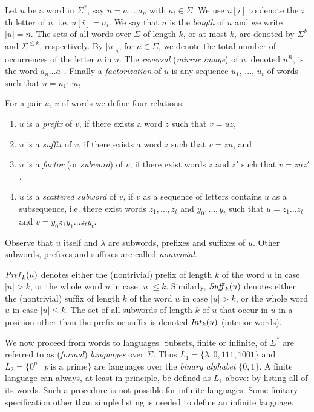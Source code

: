 Let $u$ be a word in $\Sigma^*$, say $u = a_1 \ldots a_n$ with $a_i \in \Sigma$. We use $u[i]$ to denote the $i$th letter of $u$, i.e. $u[i] = a_i$. We say that $n$ is the \emph{length} of $u$ and we write $|u|=n$. The sets of all words over $\Sigma$ of length $k$, or at most $k$, are denoted by $\Sigma^k$ and $\Sigma^{\le k}$, respectively. By $|u|_a$, for $a \in \Sigma$, we denote the total number of occurrences of the letter $a$ in $u$. The \emph{reversal} (\emph{mirror image}) of $u$, denoted $u^R$, is the word $a_n \ldots a_1$. Finally a \emph{factorization} of $u$ is any sequence $u_1$, ..., $u_t$ of words such that $u = u_1 \cdots u_t$.

For a pair $u$, $v$ of words we define four relations:

\begin{enumerate}
\item $u$ is a \emph{prefix} of $v$, if there exists a word $z$ such that $v = uz$,
\item $u$ is a \emph{suffix} of $v$, if there exists a word $z$ such that $v = zu$, and
\item $u$ is a \emph{factor} (or \emph{subword}) of $v$, if there exist words $z$ and $z'$ such that $v = zuz'$.
\item $u$ is a \emph{scattered subword} of $v$, if $v$ as a sequence of letters contains $u$ as a subsequence, i.e. there exist words $z_1, \ldots, z_t$ and $y_0, \ldots, y_t$ such that $u = z_1 \ldots z_t$ and $v = y_0 z_1 y_1 \ldots z_t y_t$.
\end{enumerate}

Observe that $u$ itself and $\lambda$ are subwords, prefixes and suffixes of $u$. Other subwords, prefixes and suffixes are called \emph{nontrivial}.

$\mbox{\it Pref\/}_k(u)$ denotes either the (nontrivial) prefix of length $k$ of the word $u$ in case $|u|>k$, or the whole word $u$ in case $|u|\le k$. Similarly, $\mbox{\it Suff\/}_k(u)$ denotes either the (nontrivial) suffix of length $k$ of the word $u$ in case $|u|>k$, or the whole word $u$ in case $|u|\le k$. The set of all subwords of length $k$ of $u$ that occur in $u$ in a position other than the prefix or suffix is denoted $\mbox{\it Int\/}_k(u)$ (interior words).

We now proceed from words to languages. Subsets, finite or infinite, of $\Sigma^*$ are referred to as (\emph{formal}) \emph{languages} over $\Sigma$. Thus $L_1 = \{\lambda, 0, 111, 1001\}$ and $L_2 = \{0^p \mid p \ \text{is a prime}\}$ are languages over the \emph{binary alphabet} $\{0, 1\}$. A finite language can always, at least in principle, be defined as $L_1$ above: by listing all of its words. Such a procedure is not possible for infinite languages. Some finitary specification other than simple listing is needed to define an infinite language. 

